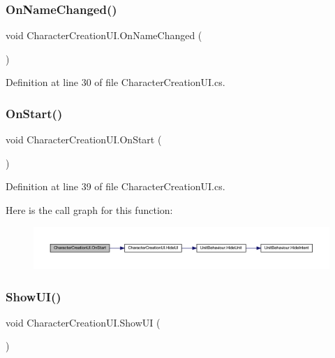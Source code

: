 \subsubsection{\texorpdfstring{OnNameChanged()}{OnNameChanged()}}
{\footnotesize\ttfamily void Character\+Creation\+U\+I.\+On\+Name\+Changed (\begin{DoxyParamCaption}{ }\end{DoxyParamCaption})}



Definition at line 30 of file Character\+Creation\+U\+I.\+cs.

\mbox{\label{class_character_creation_u_i_a656b1552f06f9611f9672489e03f8936}} 
\subsubsection{\texorpdfstring{OnStart()}{OnStart()}}
{\footnotesize\ttfamily void Character\+Creation\+U\+I.\+On\+Start (\begin{DoxyParamCaption}{ }\end{DoxyParamCaption})}



Definition at line 39 of file Character\+Creation\+U\+I.\+cs.

Here is the call graph for this function\+:
\nopagebreak
\begin{figure}[H]
\begin{center}
\leavevmode
\includegraphics[width=350pt]{class_character_creation_u_i_a656b1552f06f9611f9672489e03f8936_cgraph}
\end{center}
\end{figure}
\mbox{\label{class_character_creation_u_i_a5e683c30d28a4c97d8f84de3de2062cd}} 
\subsubsection{\texorpdfstring{ShowUI()}{ShowUI()}}
{\footnotesize\ttfamily void Character\+Creation\+U\+I.\+Show\+UI (\begin{DoxyParamCaption}{ }\end{DoxyParamCaption})}



